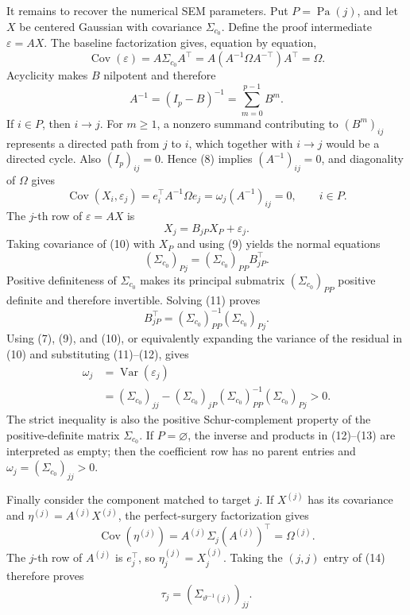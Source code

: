 It remains to recover the numerical SEM parameters.  Put
\(P=\operatorname{Pa}(j)\), and let \(X\) be centered Gaussian with covariance
\(\Sigma_{c_0}\).  Define the proof intermediate \(\varepsilon=AX\).  The
baseline factorization gives, equation by equation,
\[
 \operatorname{Cov}(\varepsilon)
 =A\Sigma_{c_0}A^{\top}
 =A(A^{-1}\Omega A^{-\top})A^{\top}
 =\Omega.                                               \tag{7}
\]
Acyclicity makes \(B\) nilpotent and therefore
\[
 A^{-1}=(I_p-B)^{-1}=\sum_{m=0}^{p-1}B^m.               \tag{8}
\]
If \(i\in P\), then \(i\to j\).  For \(m\geq1\), a nonzero summand
contributing to \((B^m)_{ij}\) represents a directed path from \(j\) to
\(i\), which together with \(i\to j\) would be a directed cycle.  Also
\((I_p)_{ij}=0\).  Hence (8) implies
\((A^{-1})_{ij}=0\), and diagonality of \(\Omega\) gives
\[
 \operatorname{Cov}(X_i,\varepsilon_j)
 =e_i^{\top}A^{-1}\Omega e_j
 =\omega_j(A^{-1})_{ij}=0,
 \qquad i\in P.                                        \tag{9}
\]
The \(j\)-th row of \(\varepsilon=AX\) is
\[
 X_j=B_{jP}X_P+\varepsilon_j.                           \tag{10}
\]
Taking covariance of (10) with \(X_P\) and using (9) yields the normal
equations
\[
 (\Sigma_{c_0})_{Pj}
 =(\Sigma_{c_0})_{PP}B_{jP}^{\top}.                     \tag{11}
\]
Positive definiteness of \(\Sigma_{c_0}\) makes its principal submatrix
\((\Sigma_{c_0})_{PP}\) positive definite and therefore invertible.  Solving
(11) proves
\[
 B_{jP}^{\top}
 =(\Sigma_{c_0})_{PP}^{-1}(\Sigma_{c_0})_{Pj}.           \tag{12}
\]
Using (7), (9), and (10), or equivalently expanding the variance of the
residual in (10) and substituting (11)--(12), gives
\[
 \begin{aligned}
 \omega_j
 &=\operatorname{Var}(\varepsilon_j)\\
 &=(\Sigma_{c_0})_{jj}
   -(\Sigma_{c_0})_{jP}
    (\Sigma_{c_0})_{PP}^{-1}
    (\Sigma_{c_0})_{Pj}>0.                              \tag{13}
 \end{aligned}
\]
The strict inequality is also the positive Schur-complement property of the
positive-definite matrix \(\Sigma_{c_0}\).  If \(P=\varnothing\), the inverse
and products in (12)--(13) are interpreted as empty; then the coefficient row
has no parent entries and \(\omega_j=(\Sigma_{c_0})_{jj}>0\).

Finally consider the component matched to target \(j\).  If \(X^{(j)}\) has
its covariance and \(\eta^{(j)}=A^{(j)}X^{(j)}\), the perfect-surgery
factorization gives
\[
 \operatorname{Cov}(\eta^{(j)})
 =A^{(j)}\Sigma_j(A^{(j)})^{\top}
 =\Omega^{(j)}.                                         \tag{14}
\]
The \(j\)-th row of \(A^{(j)}\) is \(e_j^{\top}\), so
\(\eta_j^{(j)}=X_j^{(j)}\).  Taking the \((j,j)\) entry of (14) therefore
proves
\[
 \tau_j=(\Sigma_{\vartheta^{-1}(j)})_{jj}.              \tag{15}
\]

